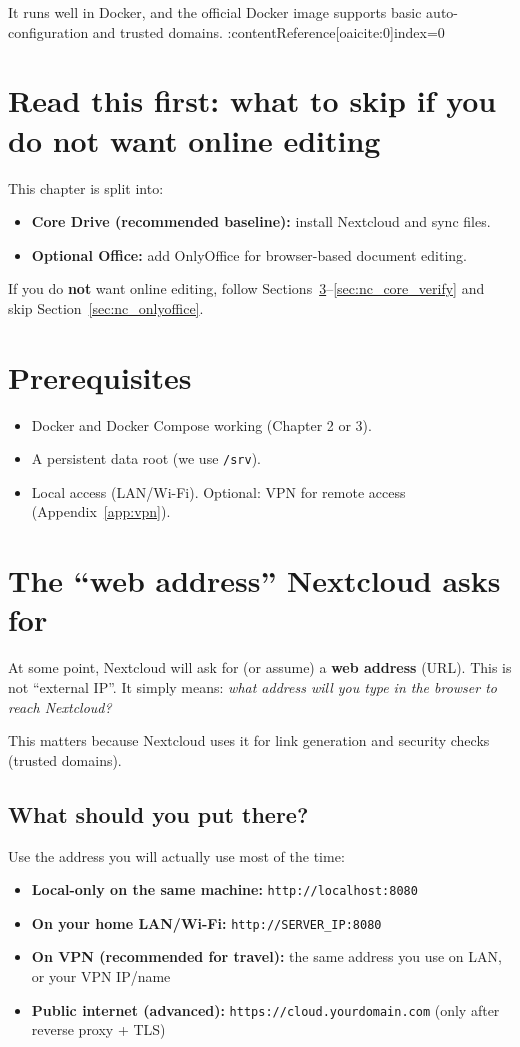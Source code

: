It runs well in Docker, and the official Docker image supports basic auto-configuration and trusted domains. :contentReference[oaicite:0]{index=0}

\section{Read this first: what to skip if you do not want online editing}
This chapter is split into:
\begin{itemize}[leftmargin=*]
  \item \textbf{Core Drive (recommended baseline):} install Nextcloud and sync files.
  \item \textbf{Optional Office:} add OnlyOffice for browser-based document editing.
\end{itemize}

If you do \textbf{not} want online editing, follow Sections~\ref{sec:nc_web_address}--\ref{sec:nc_core_verify} and skip Section~\ref{sec:nc_onlyoffice}.

\section{Prerequisites}
\begin{itemize}[leftmargin=*]
  \item Docker and Docker Compose working (Chapter 2 or 3).
  \item A persistent data root (we use \texttt{/srv}).
  \item Local access (LAN/Wi-Fi). Optional: VPN for remote access (Appendix~\ref{app:vpn}).
\end{itemize}

\section{The ``web address'' Nextcloud asks for}
\label{sec:nc_web_address}
At some point, Nextcloud will ask for (or assume) a \textbf{web address} (URL).
This is not ``external IP''. It simply means: \emph{what address will you type in the browser to reach Nextcloud?}

This matters because Nextcloud uses it for link generation and security checks (trusted domains).

\subsection*{What should you put there?}
Use the address you will actually use most of the time:
\begin{itemize}[leftmargin=*]
  \item \textbf{Local-only on the same machine:} \texttt{http://localhost:8080}
  \item \textbf{On your home LAN/Wi-Fi:} \texttt{http://SERVER\_IP:8080}
  \item \textbf{On VPN (recommended for travel):} the same address you use on LAN, or your VPN IP/name
  \item \textbf{Public internet (advanced):} \texttt{https://cloud.yourdomain.com} (only after reverse proxy + TLS)
\end{itemize}

